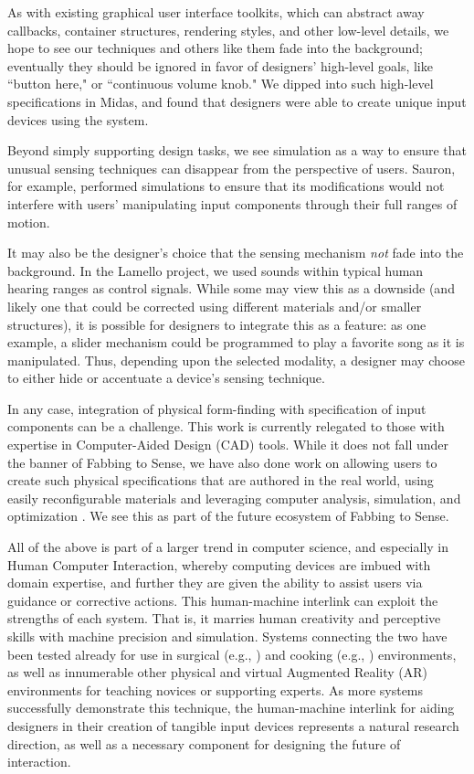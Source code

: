 As with existing graphical user interface toolkits, which can abstract away callbacks, container structures, rendering styles, and other low-level details, we hope to see our techniques and others like them fade into the background; eventually they should be ignored in favor of designers' high-level goals, like ``button here," or ``continuous volume knob." We dipped into such high-level specifications in Midas, and found that designers were able to create unique input devices using the system.

Beyond simply supporting design tasks, we see simulation as a way to ensure that unusual sensing techniques can disappear from the perspective of users. Sauron, for example, performed simulations to ensure that its modifications would not interfere with users' manipulating input components through their full ranges of motion.

It may also be the designer's choice that the sensing mechanism \emph{not} fade into the background. In the Lamello project, we used sounds within typical human hearing ranges as control signals. While some may view this as a downside (and likely one that could be corrected using different materials and/or smaller structures), it is possible for designers to integrate this as a feature: as one example, a slider mechanism could be programmed to play a favorite song as it is manipulated. Thus, depending upon the selected modality, a designer may choose to either hide or accentuate a device's sensing technique.

In any case, integration of physical form-finding with specification of input components can be a challenge. This work is currently relegated to those with expertise in Computer-Aided Design (CAD) tools. While it does not fall under the banner of Fabbing to Sense, we have also done work on allowing users to create such physical specifications that are authored in the real world, using easily reconfigurable materials and leveraging computer analysis, simulation, and optimization \cite{savage-mmarks}. We see this as part of the future ecosystem of Fabbing to Sense.

All of the above is part of a larger trend in computer science, and especially in Human Computer Interaction, whereby computing devices are imbued with domain expertise, and further they are given the ability to assist users via guidance or corrective actions. This human-machine interlink can exploit the strengths of each system. That is, it marries human creativity and perceptive skills with machine precision and simulation. Systems connecting the two have been tested already for use in surgical (e.g., \cite{kahol-surgical}) and cooking (e.g., \cite{sato-mimicook}) environments, as well as innumerable other physical and virtual Augmented Reality (AR) environments for teaching novices or supporting experts. As more systems successfully demonstrate this technique, the human-machine interlink for aiding designers in their creation of tangible input devices represents a natural research direction, as well as a necessary component for designing the future of interaction.

